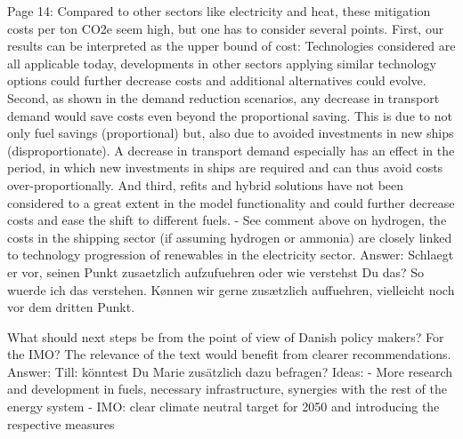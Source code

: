 Page 14: Compared to other sectors like electricity and heat, these mitigation costs per ton CO2e seem high, but one has to consider several points. First, our results can be interpreted as the upper bound of cost: Technologies considered are all applicable today, developments in other sectors applying similar technology options could further decrease costs and additional alternatives could evolve. Second, as shown in the demand reduction scenarios, any decrease in transport demand would save costs even beyond the proportional saving. This is due to not only fuel savings (proportional) but, also due to avoided investments in new ships (disproportionate). A decrease in transport demand especially has an effect in the period, in which new investments in ships are required and can thus avoid costs over-proportionally. And third, refits and hybrid solutions have not been considered to a great extent in the model functionality and could further decrease costs and ease the shift to different fuels. 
-	See comment above on hydrogen, the costs in the shipping sector (if assuming hydrogen or ammonia) are closely linked to technology progression of renewables in the electricity sector.
Answer: Schlaegt er vor, seinen Punkt zusaetzlich aufzufuehren oder wie verstehst Du das? So wuerde ich das verstehen. Kønnen wir gerne zusætzlich auffuehren, vielleicht noch vor dem dritten Punkt.

What should next steps be from the point of view of Danish policy makers? For the IMO? The relevance of the text would benefit from clearer recommendations. 
Answer: Till: könntest Du Marie zusätzlich dazu befragen?
Ideas:
- More research and development in fuels, necessary infrastructure, synergies with the rest of the energy system
- IMO: clear climate neutral target for 2050 and introducing the respective measures



